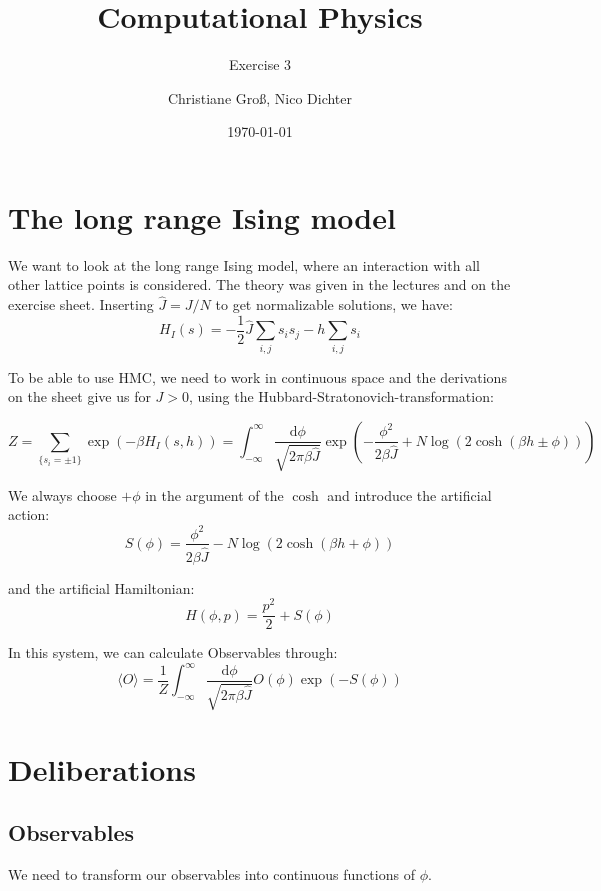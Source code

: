 \documentclass{scrartcl}
\title{Computational Physics}
\subtitle{Exercise 3}
\date{\today}
\author{Christiane Groß, Nico Dichter}
\begin{document}
	\maketitle
\section{The long range Ising model}
We want to look at the long range Ising model, where an interaction with all other lattice points is considered. The theory was given in the lectures and on the exercise sheet. Inserting $\hat{J}=J/N$ to get normalizable solutions, we have: 
\begin{equation}
H_I(s)=-\frac{1}{2}\hat{J}\sum_{i,j}s_is_j-h\sum_{i,j}s_i
\label{eq:hamiltonianising}
\end{equation}

To be able to use HMC, we need to work in continuous space and the derivations on the sheet give us for $J>0$, using the Hubbard-Stratonovich-transformation:

\begin{equation}
Z=\sum_{\{s_i=\pm1\}}\exp(-\beta H_I(s,h))=
\int_{-\infty}^{\infty}\frac{\mathrm{d} \phi}{\sqrt{2\pi\beta\hat{J}}}
\exp\left( -\frac{\phi^2}{2\beta\hat{J}}+N\log\left( 2\cosh(\beta h\pm\phi)\right) \right) 
\label{eq:partfunc}
\end{equation}


We always choose $+\phi$ in the argument of the $\cosh$ and introduce the artificial action:
\begin{equation}
S(\phi)=\frac{\phi^2}{2\beta\hat{J}}-N\log\left( 2\cosh(\beta h+\phi)\right)
\end{equation}

and the artificial Hamiltonian:
\begin{equation}
H(\phi, p)=\frac{p^2}{2}+S(\phi)
\end{equation}

In this system, we can calculate Observables through: 
\begin{equation}
\langle O\rangle=\frac{1}{Z}\int_{-\infty}^{\infty}\frac{\mathrm{d} \phi}{\sqrt{2\pi\beta\hat{J}}}O(\phi)\exp(-S(\phi))
\label{eq:observable}
\end{equation}

\section{Deliberations}

\subsection{Observables}
We need to transform our observables into continuous functions of $\phi$.
\end{document}
